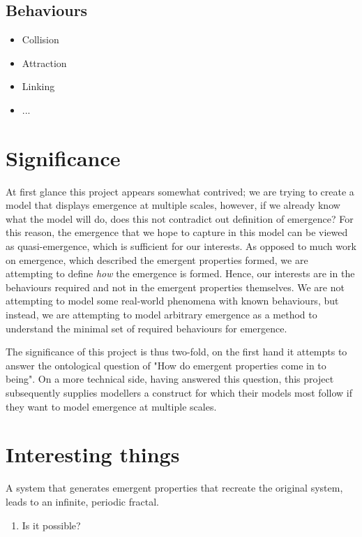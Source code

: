 \documentclass{article}
\begin{document}
  \subsection{Behaviours}
    \begin{itemize}
      \item Collision
      \item Attraction
      \item Linking
      \item ...
    \end{itemize}


\section{Significance}

At first glance this project appears somewhat contrived; we are trying to create a model that displays emergence at multiple scales, however, if we already know what the model will do, does this not contradict out definition of emergence? For this reason, the emergence that we hope to capture in this model can be viewed as quasi-emergence, which is sufficient for our interests. As opposed to much work on emergence, which described the emergent properties formed, we are attempting to define \textit{how} the emergence is formed. Hence, our interests are in the behaviours required and not in the emergent properties themselves. We are not attempting to model some real-world phenomena with known behaviours, but instead, we are attempting to model arbitrary emergence as a method to understand the minimal set of required behaviours for emergence.  

The significance of this project is thus two-fold, on the first hand it attempts to answer the ontological question of "How do emergent properties come in to being". On a more technical side, having answered this question, this project subsequently supplies modellers a construct for which their models most follow if they want to model emergence at multiple scales.


\section{Interesting things}

  A system that generates emergent properties that recreate the original system, leads to an infinite, periodic fractal. 
  \begin{enumerate}[label=\textbf{\alph*)}]
    \item Is it possible?
  \end{enumerate}
\end{document}
